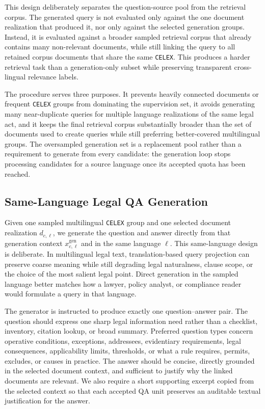 This design deliberately separates the question-source pool from the retrieval corpus. The generated query is not evaluated only against the one document realization that produced it, nor only against the selected generation groups. Instead, it is evaluated against a broader sampled retrieval corpus that already contains many non-relevant documents, while still linking the query to all retained corpus documents that share the same \texttt{CELEX}. This produces a harder retrieval task than a generation-only subset while preserving transparent cross-lingual relevance labels.

The procedure serves three purposes. It prevents heavily connected documents or frequent \texttt{CELEX} groups from dominating the supervision set, it avoids generating many near-duplicate queries for multiple language realizations of the same legal act, and it keeps the final retrieval corpus substantially broader than the set of documents used to create queries while still preferring better-covered multilingual groups. The oversampled generation set is a replacement pool rather than a requirement to generate from every candidate: the generation loop stops processing candidates for a source language once its accepted quota has been reached.

\subsection{Same-Language Legal QA Generation}

Given one sampled multilingual \texttt{CELEX} group and one selected document realization \(d_{c,\ell}\), we generate the question and answer directly from that generation context \(x^{\mathrm{gen}}_{c,\ell}\) and in the same language \(\ell\). This same-language design is deliberate. In multilingual legal text, translation-based query projection can preserve coarse meaning while still degrading legal naturalness, clause scope, or the choice of the most salient legal point. Direct generation in the sampled language better matches how a lawyer, policy analyst, or compliance reader would formulate a query in that language.

The generator is instructed to produce exactly one question--answer pair. The question should express one sharp legal information need rather than a checklist, inventory, citation lookup, or broad summary. Preferred question types concern operative conditions, exceptions, addressees, evidentiary requirements, legal consequences, applicability limits, thresholds, or what a rule requires, permits, excludes, or causes in practice. The answer should be concise, directly grounded in the selected document context, and sufficient to justify why the linked documents are relevant. We also require a short supporting excerpt copied from the selected context so that each accepted QA unit preserves an auditable textual justification for the answer.

